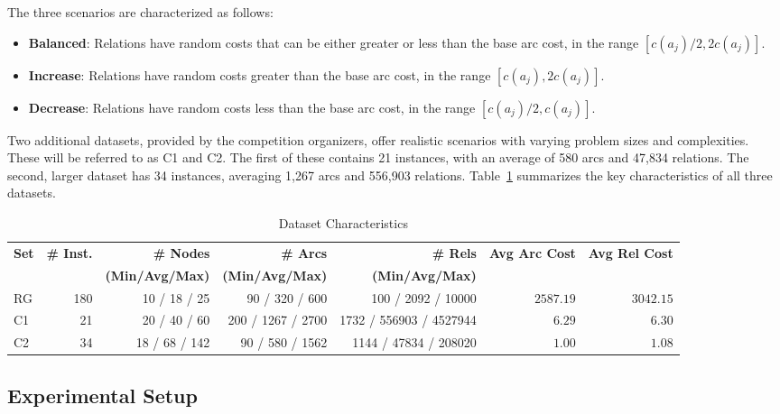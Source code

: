 \documentclass[twocolumn, switch]{article} %
\begin{document}
The three scenarios are characterized as follows:
\begin{itemize}
    \item \textbf{Balanced}: Relations have random costs that can be either greater or less than the base arc cost, in the range $[c(a_j)/2, 2c(a_j)]$.
    \item \textbf{Increase}: Relations have random costs greater than the base arc cost, in the range $[c(a_j), 2c(a_j)]$.
    \item \textbf{Decrease}: Relations have random costs less than the base arc cost, in the range $[c(a_j)/2, c(a_j)]$.
\end{itemize}

Two additional datasets, provided by the competition organizers, offer realistic scenarios with varying problem sizes and complexities. These will be referred to as C1 and C2. The first of these contains 21 instances, with an average of 580 arcs and 47,834 relations. The second, larger dataset has 34 instances, averaging 1,267 arcs and 556,903 relations. Table~\ref{tab:dataset_characteristics} summarizes the key characteristics of all three datasets.

\begin{table}[t]
    \setlength{\belowcaptionskip}{8pt}
    \caption{Dataset Characteristics}
    \label{tab:dataset_characteristics}
    \centering
    \begin{tabular}{lrrrrrr}
        \toprule
        \textbf{Set} & \textbf{\# Inst.} & \textbf{\# Nodes} & \textbf{\# Arcs} & \textbf{\# Rels} & \textbf{Avg Arc Cost} & \textbf{Avg Rel Cost} \\
        & & \textbf{(Min/Avg/Max)} & \textbf{(Min/Avg/Max)} & \textbf{(Min/Avg/Max)} & & \\
        \midrule
        RG & 180 & 10 / 18 / 25 & 90 / 320 / 600 & 100 / 2092 / 10000 & $2587.19$ & $3042.15$ \\
        C1 & 21 & 20 / 40 / 60 & 200 / 1267 / 2700 & 1732 / 556903 / 4527944 & $6.29$ & $6.30$ \\
        C2 & 34 & 18 / 68 / 142 & 90 / 580 / 1562 & 1144 / 47834 / 208020 & $1.00$ & $1.08$ \\
        \bottomrule
    \end{tabular}
\end{table}

\subsection{Experimental Setup}
\end{document}
